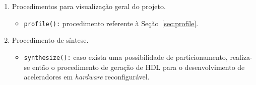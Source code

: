       \begin{enumerate}
         \item Procedimentos para visualização geral do projeto.

         \begin{itemize}
            \item \texttt{profile():}
               procedimento referente à Seção~\ref{sec:profile}.

               \begin{comment}
            \item \texttt{make\_graph(}\textit{type}\texttt{):}
               constroi-se grafos relativos ao projeto, sendo estes de acordo com o tipo especificado no parâmetro.
               O parâmetro simboliza a especificação de qual tipo de grafo será construído, sendo ele um GCF (Seção~\ref{sec:GCF}) ou GC (Seção~\ref{sec:gc}), que como já explicado, necessita do anterior para sua construção;
            \end{comment}
         \end{itemize}

         \item Procedimento de síntese.
         \begin{itemize}
            \item \texttt{synthesize():}
               caso exista uma possibilidade de particionamento,
               realiza-se então o procedimento de geração de HDL para o desenvolvimento de aceleradores em \textit{hardware} reconfigurável.%
         \end{itemize}


\end{enumerate}
